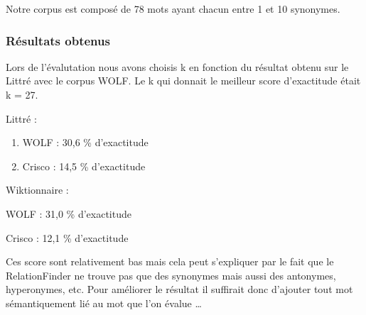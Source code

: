 Notre corpus est composé de 78 mots ayant chacun entre 1 et 10 synonymes.

\subsubsection{Résultats obtenus}

Lors de l'évalutation nous avons choisis k en fonction du résultat obtenu sur 
le Littré avec le corpus WOLF. Le k qui donnait le meilleur score d'exactitude 
était k = 27.

\begin{enumerate}
 \item {Littré :
	\begin{enumerate}
	 \item WOLF : 30,6 \% d'exactitude
	 \item Crisco : 14,5 \% d'exactitude
	\end{enumerate}
	}
 \item {Wiktionnaire :
	\item WOLF : 31,0 \% d'exactitude
	\item Crisco : 12,1 \% d'exactitude
	}
\end{enumerate}

Ces score sont relativement bas mais cela peut s'expliquer par le fait que le 
RelationFinder ne trouve pas que des synonymes mais aussi des antonymes, 
hyperonymes, etc. Pour améliorer le résultat il suffirait donc d'ajouter 
tout mot sémantiquement lié au mot que l'on évalue \dots 

